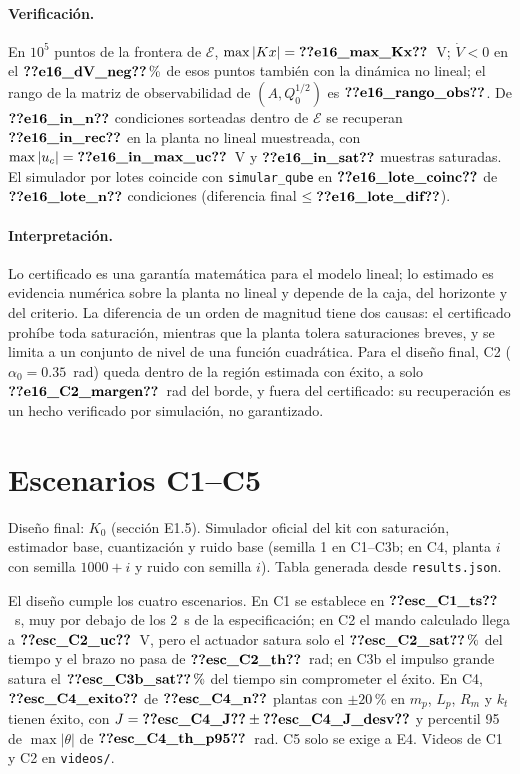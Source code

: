 \documentclass[11pt,a4paper]{article}
\begin{document}
\paragraph{Verificación.} En $10^5$ puntos de la frontera de $\mathcal E$, $\max|Kx|=\V{e16_max_Kx}$~V; $\dot V<0$ en el
$\V{e16_dV_neg}\,\%$ de esos puntos también con la dinámica no lineal; el rango de la matriz de observabilidad de
$(A,Q_0^{1/2})$ es $\V{e16_rango_obs}$. De $\V{e16_in_n}$ condiciones sorteadas dentro de $\mathcal E$ se recuperan
$\V{e16_in_rec}$ en la planta no lineal muestreada, con $\max|u_c|=\V{e16_in_max_uc}$~V y $\V{e16_in_sat}$ muestras
saturadas. El simulador por lotes coincide con \texttt{simular\_qube} en $\V{e16_lote_coinc}$ de $\V{e16_lote_n}$
condiciones (diferencia final $\le\V{e16_lote_dif}$).

\paragraph{Interpretación.} Lo certificado es una garantía matemática para el modelo lineal; lo estimado es
evidencia numérica sobre la planta no lineal y depende de la caja, del horizonte y del criterio. La diferencia de
un orden de magnitud tiene dos causas: el certificado prohíbe toda saturación, mientras que la planta tolera
saturaciones breves, y se limita a un conjunto de nivel de una función cuadrática. Para el diseño final, C2
($\alpha_0=0.35$~rad) queda dentro de la región estimada con éxito, a solo $\V{e16_C2_margen}$~rad del borde, y
fuera del certificado: su recuperación es un hecho verificado por simulación, no garantizado.

\section{Escenarios C1--C5}
Diseño final: $K_0$ (sección E1.5). Simulador oficial del kit con saturación, estimador base, cuantización y
ruido base (semilla 1 en C1--C3b; en C4, planta $i$ con semilla $1000+i$ y ruido con semilla $i$). Tabla generada
desde \texttt{results.json}.



El diseño cumple los cuatro escenarios. En C1 se establece en $\V{esc_C1_ts}$~s, muy por debajo de los 2~s
de la especificación; en C2 el mando calculado llega a $\V{esc_C2_uc}$~V, pero el actuador satura solo el
$\V{esc_C2_sat}\,\%$ del tiempo y el brazo no pasa de $\V{esc_C2_th}$~rad; en C3b el impulso grande satura el
$\V{esc_C3b_sat}\,\%$ del tiempo sin comprometer el éxito. En C4, $\V{esc_C4_exito}$ de $\V{esc_C4_n}$ plantas con
$\pm20\,\%$ en $m_p$, $L_p$, $R_m$ y $k_t$ tienen éxito, con $J=\V{esc_C4_J}\pm\V{esc_C4_J_desv}$ y percentil 95 de
$\max|\theta|$ de $\V{esc_C4_th_p95}$~rad. C5 solo se exige a E4. Videos de C1 y C2 en \texttt{videos/}.
\end{document}
